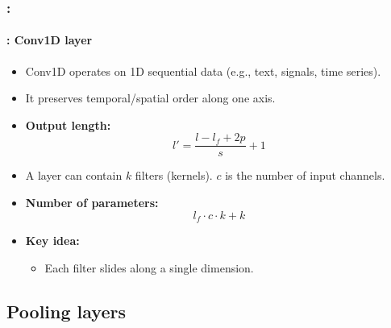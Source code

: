 \documentclass[xcolor=table]{beamer}
\begin{document}
\begin{frame}
	\frametitle{\insertshortsubtitle: \insertsection}
	\framesubtitle{\insertsubsection: Conv1D layer}
	
	\begin{minipage}{0.69\textwidth} 
		\begin{itemize}
			
			\item Conv1D operates on 1D sequential data (e.g., text, signals, time series).
			
			\item It preserves temporal/spatial order along one axis.
			
			\item \textbf{Output length:}
			\[
			l' = \frac{l - l_f + 2p}{s} + 1
			\]
			
			\item A layer can contain $k$ filters (kernels).
			$c$ is the number of input channels.
			
			\item \textbf{Number of parameters:}
			\[
			l_f \cdot c \cdot k + k
			\]
			
			\item \textbf{Key idea:}
			\begin{itemize}
				\item Each filter slides along a single dimension.
			\end{itemize}
			
		\end{itemize}
	\end{minipage}
	\begin{minipage}{0.30\textwidth}
	\end{minipage}
	
\end{frame}

\subsection{Pooling layers}
\end{document}
